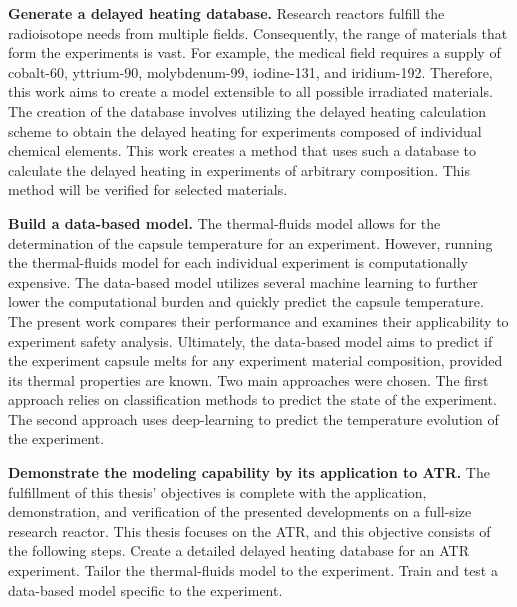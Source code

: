 
\textbf{Generate a delayed heating database.}
Research reactors fulfill the radioisotope needs from multiple fields.
Consequently, the range of materials that form the experiments is vast.
For example, the medical field requires a supply of cobalt-60, yttrium-90, molybdenum-99, iodine-131, and iridium-192.
Therefore, this work aims to create a model extensible to all possible irradiated materials.
The creation of the database involves utilizing the delayed heating calculation scheme to obtain the delayed heating for experiments composed of individual chemical elements.
This work creates a method that uses such a database to calculate the delayed heating in experiments of arbitrary composition.
This method will be verified for selected materials.

\textbf{Build a data-based model.}
The thermal-fluids model allows for the determination of the capsule temperature for an experiment.
However, running the thermal-fluids model for each individual experiment is computationally expensive.
The data-based model utilizes several machine learning to further lower the computational burden and quickly predict the capsule temperature.
The present work compares their performance and examines their applicability to experiment safety analysis.
Ultimately, the data-based model aims to predict if the experiment capsule melts for any experiment material composition, provided its thermal properties are known.
Two main approaches were chosen.
The first approach relies on classification methods to predict the state of the experiment.
The second approach uses deep-learning to predict the temperature evolution of the experiment.

\textbf{Demonstrate the modeling capability by its application to ATR.}
The fulfillment of this thesis' objectives is complete with the application, demonstration, and verification of the presented developments on a full-size research reactor.
This thesis focuses on the \gls*{ATR}, and this objective consists of the following steps.
Create a detailed delayed heating database for an ATR experiment.
Tailor the thermal-fluids model to the experiment.
Train and test a data-based model specific to the experiment.


